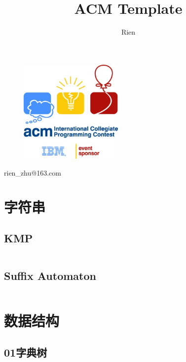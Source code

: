 \documentclass[a4paper,11pt]{article}
\author{Rien}
\title{ACM Template}
\begin{document}
\maketitle %
\thispagestyle{empty}%

\begin{figure}[H]
    \centering
    \includegraphics[width=0.45\textwidth,]{picture/logo.jpg}
    \vspace{0.5cm}
\end{figure}
\centerline{rien\_zhu@163.com}
\newpage %
\tableofcontents %
\thispagestyle{empty}%
\newpage
\setcounter{page}{1}%
\section{字符串}
\subsection{KMP}
\inputminted[breaklines,linenos,frame=leftline]{c++}{string/kmp.cpp}

\subsection{Suffix Automaton}
\inputminted[breaklines]{c++}{string/suffix-automaton.cc}
\newpage
\section{数据结构}
\subsection{01字典树}
\inputminted[breaklines,linenos,frame=leftline]{c++}{DataStruct/trie.cpp}
\end{document}
